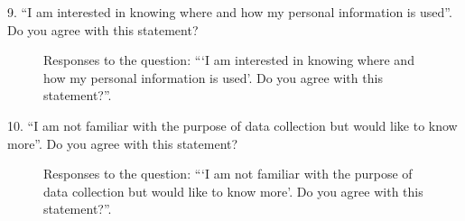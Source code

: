 \vspace{2cm}

9. ``I am interested in knowing where and how my personal information is used''. Do you agree with this statement?

\begin{figure}[H]
    \centering
    \caption*{Responses to the question: ```I am interested in knowing where and how my personal information is used'. Do you agree with this statement?''.}
    \label{fig:survey_s2_q9}
\end{figure}

\clearpage

10. ``I am not familiar with the purpose of data collection but would like to know more''. Do you agree with this statement?

\begin{figure}[H]
    \begin{center}
        \caption*{Responses to the question: ```I am not familiar with the purpose of data collection but would like to know more'. Do you agree with this statement?''.}
        \label{fig:survey_s2_q10}
    \end{center}
\end{figure}

\vspace{2cm}

